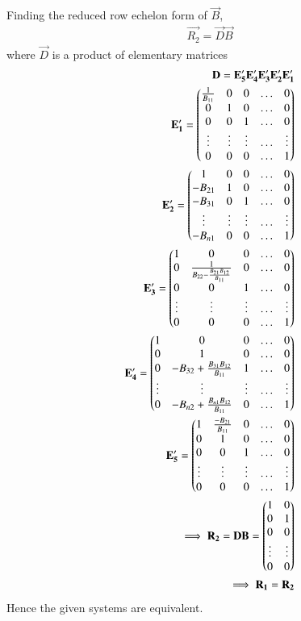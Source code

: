 \documentclass[journal,12pt,twocolumn]{IEEEtran}
\begin{document}
Finding the reduced row echelon form of $\vec{B}$,
\begin{align}
    \vec{R_2}=\vec{D}\vec{B}
\end{align}
where $\vec{D}$ is a product of elementary matrices
\begin{align}
    \mathbf{D}=\mathbf{E'_5}\mathbf{E'_4}\mathbf{E'_3}\mathbf{E'_2}\mathbf{E'_1}\\
    \mathbf{E'_1}=\begin{pmatrix}\frac{1}{B_{11}}&0&0&\hdots&0\\0&1&0&\hdots&0\\0&0&1&\hdots&0\\\vdots&\vdots&\vdots&\hdots&\vdots\\0&0&0&\hdots&1\end{pmatrix}\\
   \mathbf{E'_2}=\begin{pmatrix}1&0&0&\hdots&0\\-B_{21}&1&0&\hdots&0\\-B_{31}&0&1&\hdots&0\\\vdots&\vdots&\vdots&\hdots&\vdots\\-B_{n1}&0&0&\hdots&1\end{pmatrix}\\
   \mathbf{E'_3}=\begin{pmatrix}1&0&0&\hdots&0\\0&\frac{1}{B_{22}-\frac{B_{21}B_{12}}{B_{11}}}&0&\hdots&0\\0&0&1&\hdots&0\\\vdots&\vdots&\vdots&\hdots&\vdots\\0&0&0&\hdots&1\end{pmatrix}\\
   \mathbf{E'_4}=\begin{pmatrix}1&0&0&\hdots&0\\0&1&0&\hdots&0\\0&-B_{32}+\frac{B_{31}B_{12}}{B_{11}}&1&\hdots&0\\\vdots&\vdots&\vdots&\hdots&\vdots\\0&-B_{n2}+\frac{B_{n1}B_{12}}{B_{11}}&0&\hdots&1\end{pmatrix}\\
   \mathbf{E'_5}=\begin{pmatrix}1&\frac{-B_{21}}{B_{11}}&0&\hdots&0\\0&1&0&\hdots&0\\0&0&1&\hdots&0\\\vdots&\vdots&\vdots&\hdots&\vdots\\0&0&0&\hdots&1\end{pmatrix}\\
    \implies \mathbf{R_2}=\mathbf{D}\mathbf{B}=\begin{pmatrix}1&0\\0&1\\0&0\\\vdots&\vdots\\0&0\end{pmatrix}\\
   \implies \mathbf{R_1}=\mathbf{R_2}
\end{align}
Hence the given systems are equivalent.
\end{document}
